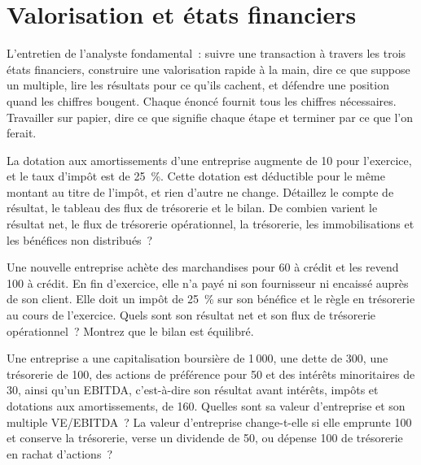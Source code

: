 \chapter{Valorisation et états financiers}\label{ch:iv2:valuation-and-financial-statements}

\begin{ivtrains}
L'entretien de l'analyste fondamental~: suivre une transaction à travers les trois états financiers, construire une valorisation rapide à la main, dire ce que suppose un multiple, lire les résultats pour ce qu'ils cachent, et défendre une position quand les chiffres bougent. Chaque énoncé fournit tous les chiffres nécessaires. Travailler sur papier, dire ce que signifie chaque étape et terminer par ce que l'on ferait.
\end{ivtrains}

\begin{question}\label{iq:iv2:valuation-and-financial-statements:1}
La dotation aux amortissements d'une entreprise augmente de 10 pour l'exercice, et le taux d'impôt est de 25~\%. Cette dotation est déductible pour le même montant au titre de l'impôt, et rien d'autre ne change. Détaillez le compte de résultat, le tableau des flux de trésorerie et le bilan. De combien varient le résultat net, le flux de trésorerie opérationnel, la trésorerie, les immobilisations et les bénéfices non distribués~?
\end{question}

\begin{question}\label{iq:iv2:valuation-and-financial-statements:2}
Une nouvelle entreprise achète des marchandises pour 60 à crédit et les revend 100 à crédit. En fin d'exercice, elle n'a payé ni son fournisseur ni encaissé auprès de son client. Elle doit un impôt de 25~\% sur son bénéfice et le règle en trésorerie au cours de l'exercice. Quels sont son résultat net et son flux de trésorerie opérationnel~? Montrez que le bilan est équilibré.
\end{question}

\begin{question}\label{iq:iv2:valuation-and-financial-statements:3}
Une entreprise a une capitalisation boursière de 1\,000, une dette de 300, une trésorerie de 100, des actions de préférence pour 50 et des intérêts minoritaires de 30, ainsi qu'un EBITDA, c'est-à-dire son résultat avant intérêts, impôts et dotations aux amortissements, de 160. Quelles sont sa valeur d'entreprise et son multiple VE/EBITDA~? La valeur d'entreprise change-t-elle si elle emprunte 100 et conserve la trésorerie, verse un dividende de 50, ou dépense 100 de trésorerie en rachat d'actions~?
\end{question}

